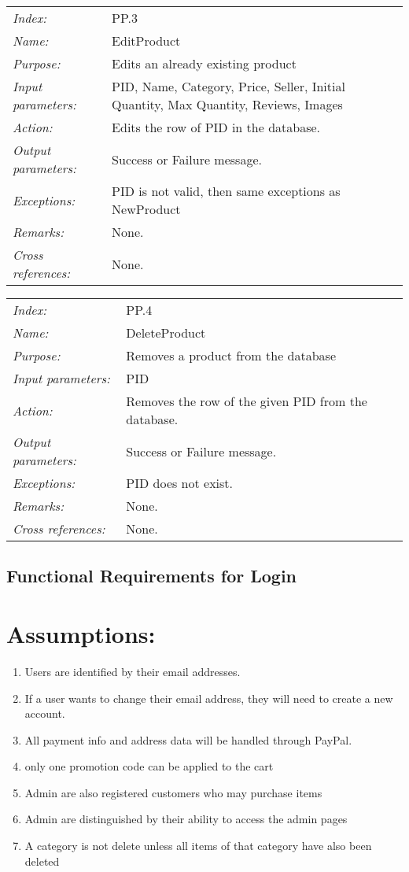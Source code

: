 \documentclass[10pt,letter]{article}
\begin{document}
\begin{tabularx}{\textwidth}{l X}
    \it{Index:} & PP.3 \\
    \it{Name:} & EditProduct \\
    \it{Purpose:} & Edits an already existing product \\
    \it{Input parameters:} & PID, Name, Category, Price, Seller, Initial Quantity, Max Quantity, Reviews, Images\\
    \it{Action:} & Edits the row of PID in the database.\\
    \it{Output parameters:} & Success or Failure message. \\
    \it{Exceptions:} & PID is not valid, then same exceptions as NewProduct \\
    \it{Remarks:} & None. \\
    \it{Cross references:} & None. \\
    \hline
\end{tabularx}

\begin{tabularx}{\textwidth}{l X}
    \it{Index:} & PP.4 \\
    \it{Name:} & DeleteProduct \\
    \it{Purpose:} & Removes a product from the database\\
    \it{Input parameters:} & PID\\
    \it{Action:} & Removes the row of the given PID from the database.\\
    \it{Output parameters:} & Success or Failure message. \\
    \it{Exceptions:} & PID does not exist. \\
    \it{Remarks:} & None. \\
    \it{Cross references:} & None. \\
    \hline
\end{tabularx}


\subsection{Functional Requirements for Login}


\section{Assumptions:}
\begin{enumerate}
    \item Users are identified by their email addresses.
    \item If a user wants to change their email address, they will need to create a new account.
    \item All payment info and address data will be handled through PayPal.
    \item only one promotion code can be applied to the cart
    \item Admin are also registered customers who may purchase items
    \item Admin are distinguished by their ability to access the admin pages
    \item A category is not delete unless all items of that category have also been deleted
\end{enumerate}
\end{document}
